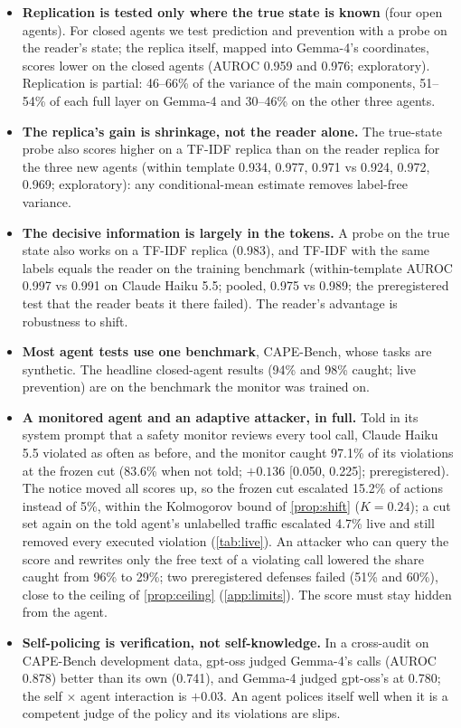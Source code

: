 \begin{itemize}
\item \textbf{Replication is tested only where the true state is known} (four open agents). For closed agents we test
  prediction and prevention with a probe on the reader's state; the replica itself, mapped into Gemma-4's coordinates,
  scores lower on the closed agents (AUROC 0.959 and 0.976; exploratory). Replication is partial: 46--66\% of the
  variance of the main components, 51--54\% of each full layer on Gemma-4 and 30--46\% on the other three agents.
\item \textbf{The replica's gain is shrinkage, not the reader alone.} The true-state probe also scores higher on a TF-IDF replica than on the reader replica for the three new agents (within template 0.934, 0.977, 0.971 vs 0.924, 0.972, 0.969; exploratory): any conditional-mean estimate removes label-free variance.
\item \textbf{The decisive information is largely in the tokens.} A probe on the true state also works on a TF-IDF replica
  (0.983), and TF-IDF with the same labels equals the reader on the training benchmark (within-template AUROC 0.997 vs 0.991 on Claude Haiku 5.5; pooled, 0.975 vs 0.989; the
  preregistered test that the reader beats it there failed). The reader's advantage is robustness to shift.
\item \textbf{Most agent tests use one benchmark}, CAPE-Bench, whose tasks are synthetic. The headline closed-agent
  results (94\% and 98\% caught; live prevention) are on the benchmark the monitor was trained on.
\item \textbf{A monitored agent and an adaptive attacker, in full.} Told in its system prompt that a safety monitor reviews every tool call, Claude Haiku 5.5 violated as often as before, and the monitor caught 97.1\% of its violations at the frozen cut (83.6\% when not told; $+0.136$ [0.050, 0.225]; preregistered). The notice moved all scores up, so the frozen cut escalated 15.2\% of actions instead of 5\%, within the Kolmogorov bound of \cref{prop:shift} ($K=0.24$); a cut set again on the told agent's unlabelled traffic escalated 4.7\% live and still removed every executed violation (\cref{tab:live}). An attacker who can query the score and rewrites only the free text of a violating call lowered the share caught from 96\% to 29\%; two preregistered defenses failed (51\% and 60\%), close to the ceiling of \cref{prop:ceiling} (\cref{app:limits}). The score must stay hidden from the agent.
\item \textbf{Self-policing is verification, not self-knowledge.} In a cross-audit on CAPE-Bench development data, gpt-oss judged Gemma-4's calls (AUROC 0.878) better than its own (0.741), and Gemma-4 judged gpt-oss's at 0.780; the self $\times$ agent interaction is $+0.03$. An agent polices itself well when it is a competent judge of the policy and its violations are slips.

\end{itemize}
